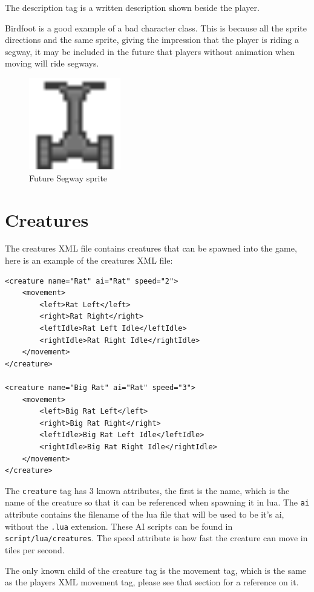 \documentclass{book}
\begin{document}
The description tag is a written description shown beside the player.

Birdfoot is a good example of a bad character class. This is because all the sprite directions and the same sprite, giving the impression that the player is riding a segway, it may be included in the future that players without animation when moving will ride segways.

\begin{figure}[ht!]
		\centering
		\includegraphics[width=40mm]{Nice_Segway.png}
		\caption{Future Segway sprite}
\end{figure}

\section{Creatures}
The creatures XML file contains creatures that can be spawned into the game, here is an example of the creatures XML file:

\begin{verbatim}
<creature name="Rat" ai="Rat" speed="2">
	<movement>
		<left>Rat Left</left>
		<right>Rat Right</right>
		<leftIdle>Rat Left Idle</leftIdle>
		<rightIdle>Rat Right Idle</rightIdle>
	</movement>
</creature>

<creature name="Big Rat" ai="Rat" speed="3">
	<movement>
		<left>Big Rat Left</left>
		<right>Big Rat Right</right>
		<leftIdle>Big Rat Left Idle</leftIdle>
		<rightIdle>Big Rat Right Idle</rightIdle>
	</movement>
</creature>
\end{verbatim}

The \texttt{creature} tag has 3 known attributes, the first is the name, which is the name of the creature so that it can be referenced when spawning it in lua. The \texttt{ai} attribute contains the filename of the lua file that will be used to be it's ai, without the \texttt{.lua} extension. These AI scripts can be found in \texttt{script/lua/creatures}. The speed attribute is how fast the creature can move in tiles per second.

The only known child of the creature tag is the movement tag, which is the same as the players XML movement tag, please see that section for a reference on it.
\end{document}

